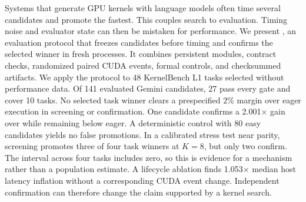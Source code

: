 Systems that generate GPU kernels with language models often time several
candidates and promote the fastest. This couples search to evaluation. Timing
noise and evaluator state can then be mistaken for performance. We present
\system{}, an evaluation protocol that freezes candidates before timing and
confirms the selected winner in fresh processes. It combines persistent modules,
contract checks, randomized paired CUDA events, formal controls, and checksummed
artifacts. We apply the protocol to 48 KernelBench L1 tasks selected without
performance data. Of 141 evaluated Gemini candidates, 27 pass every gate and
cover 10 tasks. No selected task winner clears a prespecified 2\% margin over
eager execution in screening or confirmation. One candidate confirms a
2.001$\times$ gain over  while remaining below eager. A
deterministic control with 80 easy candidates yields no false promotions. In a
calibrated stress test near parity, screening promotes three of four task winners
at $K=8$, but only two confirm. The interval across four tasks includes zero, so
this is evidence for a mechanism rather than a population estimate. A lifecycle
ablation finds 1.053$\times$ median host latency inflation without a corresponding
CUDA event change. Independent confirmation can therefore change the claim
supported by a kernel search.
